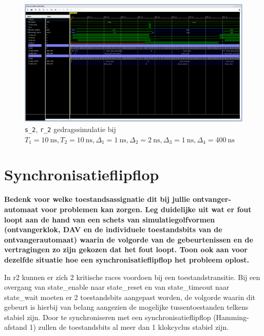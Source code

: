 \documentclass[titlepage]{article}
\begin{document}
\begin{figure}[htpb]
    \centering
    \includegraphics[trim={0 375px 0 0}, clip, width =\linewidth]{sr2_gedragssimulatie_10_10_1_2_1_400.PNG}
    \caption{\texttt{s\_2}, \texttt{r\_2} gedragssimulatie bij \(T_1 = \SI{10}{\nano\second}, T_2 = \SI{10}{\nano\second},
    \Delta_1 = \SI{1}{\nano\second}, \Delta_2 = \SI{2}{\nano\second}, \Delta_3 = \SI{1}{\nano\second}, \Delta_4 = \SI{400}{\nano\second} \)}
    \label{fig:sr2_behav_10_10_1_2_1_400}
\end{figure}

\clearpage

\section{Synchronisatieflipflop}

\noindent \textbf{Bedenk voor welke toestandsassignatie dit bij jullie ontvanger-automaat voor problemen kan zorgen. Leg duidelijke uit wat er fout loopt aan de hand van een schets van simulatiegolfvormen (ontvangerklok, DAV en de individuele toestandsbits van de ontvangerautomaat) waarin de volgorde van de gebeurtenissen en de vertragingen zo zijn gekozen dat het fout loopt. Toon ook aan voor dezelfde situatie hoe een synchronisatieflipflop	het probleem oplost.}

In r2 kunnen er zich 2 kritische races voordoen bij een toestandstransitie.
Bij een overgang van state_enable naar state_reset en van state_timeout naar state_wait moeten er 2 toestandsbits aangepast worden,
de volgorde waarin dit gebeurt is hierbij van belang aangezien de mogelijke tussentoestanden telkens stabiel zijn.
Door te synchroniseren met een synchronisatieflipflop (Hamming-afstand 1) zullen de toestandsbits al meer dan 1 klokcyclus stabiel zijn.
\end{document}
